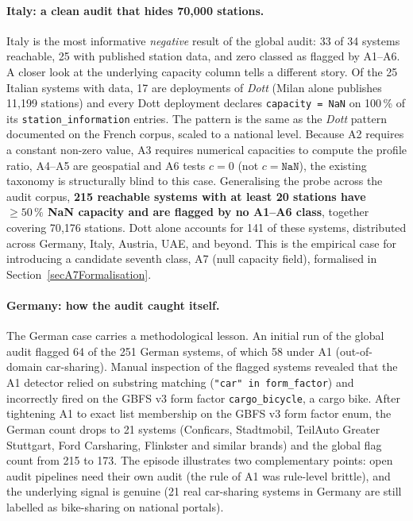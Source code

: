 \documentclass[11pt,a4paper]{article}
\begin{document}
\paragraph{Italy: a clean audit that hides 70{,}000 stations.}
Italy is the most informative \emph{negative} result of the global
audit: 33 of 34 systems reachable, 25 with published station data,
and zero classed as flagged by A1--A6. A closer look at the
underlying capacity column tells a different story. Of the 25
Italian systems with data, 17 are deployments of \emph{Dott} (Milan
alone publishes 11{,}199 stations) and every Dott deployment
declares \texttt{capacity = NaN} on 100\,\% of its
\texttt{station\_information} entries. The pattern is the same as
the \emph{Dott} pattern documented on the French corpus, scaled to
a national level. Because A2 requires a constant non-zero value, A3
requires numerical capacities to compute the profile ratio, A4--A5
are geospatial and A6 tests $c = 0$ (not $c = \texttt{NaN}$), the
existing taxonomy is structurally blind to this case. Generalising
the probe across the audit corpus, \textbf{215 reachable systems
with at least 20 stations have $\geq 50\,\%$ NaN capacity and are
flagged by no A1--A6 class}, together covering 70{,}176 stations.
Dott alone accounts for 141 of these systems, distributed across
Germany, Italy, Austria, UAE, and beyond. This is the empirical
case for introducing a candidate seventh class, A7 (null capacity
field), formalised in Section~\ref{secA7Formalisation}.

\paragraph{Germany: how the audit caught itself.}
The German case carries a methodological lesson. An initial run of
the global audit flagged 64 of the 251 German systems, of which 58
under A1 (out-of-domain car-sharing). Manual inspection of the
flagged systems revealed that the A1 detector relied on substring
matching (\texttt{"car" in form\_factor}) and incorrectly fired on
the GBFS v3 form factor \texttt{cargo\_bicycle}, a cargo bike. After
tightening A1 to exact list membership on the GBFS v3 form factor
enum, the German count drops to 21 systems (Conficars, Stadtmobil,
TeilAuto Greater Stuttgart, Ford Carsharing, Flinkster and similar
brands) and the global flag count from 215 to 173. The episode
illustrates two complementary points: open audit pipelines need
their own audit (the rule of A1 was rule-level brittle), and the
underlying signal is genuine (21 real car-sharing systems in
Germany are still labelled as bike-sharing on national portals).
\end{document}
